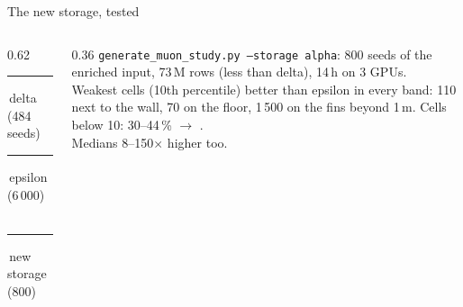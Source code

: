 \documentclass[aspectratio=169,10pt]{beamer}
\newcommand{\legendline}[1]{{\color{muted}\lightfont\scriptsize #1}}
\newcommand{\sw}[1]{\textcolor[HTML]{#1}{\rule{1.1ex}{1.1ex}}}
\begin{document}
\begin{frame}{The new storage, tested}
  \begin{columns}[c]
    \begin{column}{0.62\textwidth}
      \\[0.5mm]
      \legendline{\sw{2a78d6}\,delta (484 seeds) \ \sw{eb6834}\,epsilon (6\,000) \ \sw{1baf7a}\,new storage (800)}\\[0.5mm]
    \end{column}
    \begin{column}{0.36\textwidth}\footnotesize
      \texttt{generate\_muon\_study.py --storage alpha}: 800 seeds of the enriched input, 73\,M rows (less than delta), 14\,h on 3 GPUs.\\[1.5mm]
      Weakest cells (10th percentile)  better than epsilon in every band: 110 next to the wall, 70 on the floor, 1\,500 on the fins beyond 1\,m. Cells below 10: 30--44\,\% $\to$ .\\[1mm]
      Medians 8--150$\times$ higher too.\\[1.5mm]
    \end{column}
  \end{columns}
\end{frame}
\end{document}
